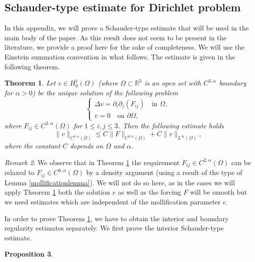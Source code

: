 \documentclass[12pt,a4paper]{article}
\newtheorem{theorem}{Theorem}[section]
\newtheorem{proposition}[theorem]{Proposition}
\theoremstyle{definition}
\theoremstyle{remark}
\newtheorem{remark}[theorem]{Remark}
\numberwithin{equation}{section}
\begin{document}
\begin{appendices}
\section{Schauder-type estimate for Dirichlet problem} \label{schauderappendix1}
In this appendix, we will prove a Schauder-type estimate that will be used in the main body of the paper. As this result does not seem to be present in the literature, we provide a proof here for the sake of completeness. We will use the Einstein summation convention in what follows. The estimate is given in the following theorem.
\begin{theorem} \label{dirichletschauderestimate}
Let $v \in H^1_0 (\Omega)$ (where $\Omega \subset \mathbb{R}^3$ is an open set with $C^{3,\alpha}$ boundary for $\alpha > 0$) be the unique solution of the following problem
\begin{equation} \label{ellipticschaudereq}
\begin{cases}
\Delta v = \partial_i \partial_j (F_{ij}) \quad \text{in } \Omega, \\
v = 0 \quad \text{on } \partial \Omega,
\end{cases}
\end{equation}
where $F_{ij} \in C^{2,\alpha} (\Omega)$ for $1 \leq i,j \leq 3$. Then the following estimate holds
\begin{equation}
\lVert v \rVert_{C^{0,\alpha} (\Omega)} \leq C \lVert F \rVert_{C^{0,\alpha} (\Omega)} + C \lVert v \rVert_{L^\infty (\Omega)} ,
\end{equation}
where the constant $C$ depends on $\Omega$ and $\alpha$.
\end{theorem}
\begin{remark}
We observe that in Theorem \ref{dirichletschauderestimate} the requirement $F_{ij} \in C^{2,\alpha} (\Omega)$ can be relaxed to $F_{ij} \in C^{0,\alpha} (\Omega)$ by a density argument (using a result of the type of Lemma \ref{mollificationlemma}). We will not do so here, as in the cases we will apply Theorem \ref{dirichletschauderestimate} both the solution $v$ as well as the forcing $F$ will be smooth but we need estimates which are independent of the mollification parameter $\epsilon$.
\end{remark}
In order to prove Theorem \ref{dirichletschauderestimate}, we have to obtain the interior and boundary regularity estimates separately. We first prove the interior Schauder-type estimate.
\begin{proposition} \label{interiorschauderprop}

\end{proposition}
\end{appendices}
\end{document}
